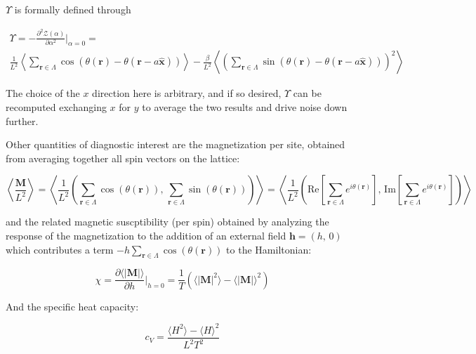 \documentclass[12pt]{article}
\begin{document}
$\Upsilon$ is formally defined through

\begin{multline} \label{eq:helicity}
	\Upsilon = -\frac{\partial^2\mathcal{Z}(\alpha)}{\partial\alpha^2}\Big|_{\alpha=0} = \\ \frac{1}{L^2} \left\langle \sum_{\mathbf{r}\in\Lambda} \cos(\theta(\mathbf{r})-\theta(\mathbf{r}-a\hat{\mathbf{x}}))
	\right\rangle - \frac{\beta}{L^2} \left\langle \left( \sum_{\mathbf{r}\in\Lambda} \sin(\theta(\mathbf{r})-\theta(\mathbf{r}-a\hat{\mathbf{x}})) \right)^2 \right\rangle
\end{multline}

The choice of the $x$ direction here is arbitrary, and if so desired, $\Upsilon$ can be recomputed exchanging $x$ for $y$ to average the two results
and drive noise down further.

Other quantities of diagnostic interest are the magnetization per site, obtained from averaging together all spin vectors on the lattice:

\begin{equation*}
	\left\langle \frac{\mathbf{M}}{L^2} \right\rangle = \left\langle \frac{1}{L^2} \left( \sum_{\mathbf{r}\in\Lambda} \cos(\theta(\mathbf{r})) ,\,  \sum_{\mathbf{r}\in\Lambda} \sin(\theta(\mathbf{r})) \right) \right\rangle =
	\left\langle \frac{1}{L^2} \left( \mathrm{Re}\left[\sum_{\mathbf{r}\in\Lambda}e^{i\theta(\mathbf{r})} \right],\, \mathrm{Im}\left[ \sum_{\mathbf{r}\in\Lambda} e^{i\theta(\mathbf{r})}\right] \right) \right\rangle
\end{equation*}

and the related magnetic suscptibility (per spin) obtained by analyzing the response of the magnetization to the addition of an external field $\mathbf{h}=(h,\,0)$ which contributes 
a term $-h \sum_{\mathbf{r}\in \Lambda}\cos(\theta(\mathbf{r}))$ to the Hamiltonian:

\begin{equation} \label{eq:susc}
	\chi = \frac{\partial \langle|\mathbf{M}|\rangle}{\partial h}\big|_{h=0} = \frac{1}{T} \left( \langle |\mathbf{M}|^2 \rangle - \langle |\mathbf{M}| \rangle^2 \right)
\end{equation}

And the specific heat capacity:

\begin{equation} \label{eq:heat}
	c_V = \frac{\langle H^2 \rangle - \langle H \rangle^2}{L^2 T^2}
\end{equation}
\end{document}
